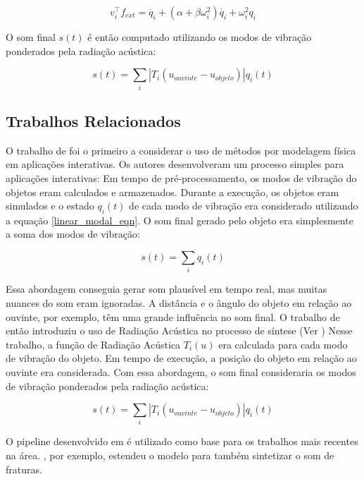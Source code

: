 \begin{equation}
	v_i^\intercal f_{ext} = \ddot{q_i} + (\alpha + \beta\omega_i^2)\dot{q_i} + \omega_i^2q_{i}
\end{equation}

O som final $s(t)$ é então computado utilizando os modos de vibração ponderados pela radiação acústica:

\begin{equation}
	s(t) = \sum_i |T_i(u_{ouvinte}-u_{objeto})| q_i(t)
\end{equation}

\subsection{Trabalhos Relacionados}


O trabalho de \cite{van2001foleyautomatic} foi o primeiro a considerar o uso de métodos por modelagem física em aplicações interativas. Os autores desenvolveram um processo simples para aplicações interativas: Em tempo de pré-processamento, os modos de vibração do objetos eram calculados e armazenados. Durante a execução, os objetos eram simulados e o estado $q_i(t)$ de cada modo de vibração era considerado utilizando a equação \eqref{linear_modal_eqn}. O som final gerado pelo objeto era simplesmente a soma dos modos de vibração:

\begin{equation}
	s(t) = \sum_i q_i(t)
\end{equation}

Essa abordagem conseguia gerar som plausível em tempo real, mas muitas nuances do som eram ignoradas. A distância e o ângulo do objeto em relação ao ouvinte, por exemplo, têm uma grande influência no som final. O trabalho de \cite{james2006precomputed} então introduziu o uso de Radiação Acústica no processo de síntese (Ver ) Nesse trabalho, a função de Radiação Acústica $T_i(u)$ era calculada para cada modo de vibração do objeto. Em tempo de execução, a posição do objeto em relação ao ouvinte era considerada. Com essa abordagem, o som final consideraria os modos de vibração ponderados pela radiação acústica: 

\begin{equation}
	s(t) = \sum_i |T_i(u_{ouvinte}-u_{objeto})| q_i(t)
\end{equation}

O pipeline desenvolvido em \cite{james2006precomputed} é utilizado como base para os trabalhos mais recentes na área. \cite{zheng2010rigid}, por exemplo, estendeu o modelo para também sintetizar o som de fraturas.

